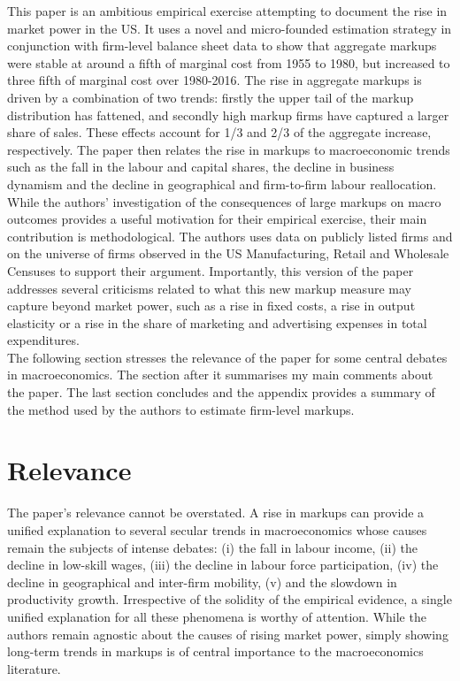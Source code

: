 \documentclass{amsart}
\theoremstyle{definition}
\theoremstyle{remark}
\numberwithin{equation}{section}
\begin{document}
This paper is an ambitious empirical exercise attempting to document the rise in market power in the US. It uses a novel and micro-founded estimation strategy in conjunction with firm-level balance sheet data to show that aggregate markups were stable at around a fifth of marginal cost from 1955 to 1980, but increased to three fifth of marginal cost over 1980-2016. The rise in aggregate markups is driven by a combination of two trends: firstly the upper tail of the markup distribution has fattened, and secondly high markup firms have captured a larger share of sales. These effects account for 1/3 and 2/3 of the aggregate increase, respectively. The paper then relates the rise in markups to macroeconomic trends such as the fall in the labour and capital shares, the decline in business dynamism and the decline in geographical and firm-to-firm labour reallocation.\\

While the authors' investigation of the consequences of large markups on macro outcomes provides a useful motivation for their empirical exercise, their main contribution is methodological. The authors uses data on publicly listed firms and on the universe of firms observed in the US Manufacturing, Retail and Wholesale Censuses to support their argument. Importantly, this version of the paper addresses several criticisms related to what this new markup measure may capture beyond market power, such as a rise in fixed costs, a rise in output elasticity or a rise in the share of marketing and advertising expenses in total expenditures.\\

The following section stresses the relevance of the paper for some central debates in macroeconomics. The section after it summarises my main comments about the paper. The last section concludes and the appendix provides a summary of the method used by the authors to estimate firm-level markups.

\section*{Relevance}

The paper's relevance cannot be overstated. A rise in markups can provide a unified explanation to several secular trends in macroeconomics whose causes remain the subjects of intense debates: (i) the fall in labour income, (ii) the decline in low-skill wages, (iii) the decline in labour force participation, (iv) the decline in geographical and inter-firm mobility, (v) and the slowdown in productivity growth. Irrespective of the solidity of the empirical evidence, a single unified explanation for all these phenomena is worthy of attention. While the authors remain agnostic about the causes of rising market power, simply showing long-term trends in markups is of central importance to the macroeconomics literature.\\
\end{document}
